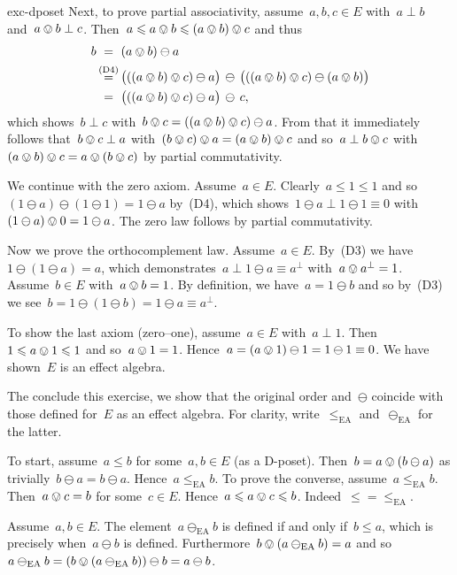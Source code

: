 \begin{solution}{exc-dposet}
Next, to prove partial associativity, assume~$a,b,c\in E$
    with~$a \perp b$ and~$a \ovee b \perp c$.
Then~$a \leq a \ovee b \leq (a \ovee b) \ovee c$ and thus
\begin{align*}
    b & \ =\ (a \ovee b) \ominus a \\
    & \ \overset{\mathclap{\mathrm{(D4)}}}{=} \ 
    \bigl( ((a \ovee b) \ovee c) \ominus a \bigr) \,
    \ominus \, \bigl( ((a\ovee b) \ovee c) \ominus (a \ovee b) \bigr) \\
    & \ = \ 
    \bigl( ((a \ovee b) \ovee c) \ominus a \bigr) \,
    \ominus \, c,
\end{align*}
which shows~$b \perp c$
    with~$b \ovee c=  ((a \ovee b) \ovee c) \ominus a$.
From that it immediately follows
    that~$b \ovee c \perp a$ with~$(b\ovee c)\ovee a = (a\ovee b) \ovee c$
        and so~$a \perp b \ovee c$
            with~$(a \ovee b) \ovee c = a \ovee (b \ovee c)$
                by partial commutativity.

We continue with the zero axiom.
Assume~$a \in E$.
Clearly~$a \leq 1 \leq 1$ and
    so~$(1 \ominus a) \ominus (1 \ominus 1) = 1 \ominus a$ by~(D4),
    which shows~$1 \ominus a \perp  1\ominus 1 \equiv 0$
    with~$(1 \ominus a) \ovee 0 = 1\ominus a$.
    The zero law follows by partial commutativity.

Now we prove the orthocomplement law.
Assume~$a \in E$.
By~(D3) we have~$1 \ominus( 1\ominus a) = a$,
    which demonstrates~$a \perp 1\ominus a \equiv a^\perp$
    with~$a \ovee a^\perp = 1$.
Assume~$b \in E$ with~$a \ovee b = 1$.
By definition, we have~$a = 1 \ominus b$ and so by~(D3)
    we see~$b = 1 \ominus (1 \ominus b) = 1 \ominus a \equiv a^\perp$.

To show the last axiom (zero--one), assume~$a \in E$ with~$a\perp 1$.
Then~$1 \leq a\ovee 1 \leq 1$ and so~$a \ovee 1 = 1$.
Hence~$a = (a\ovee 1) \ominus 1 = 1\ominus 1 \equiv 0$.
We have shown~$E$ is an effect algebra.

The conclude this exercise, we show that the original
    order and~$\ominus$ coincide with
    those defined for~$E$ as an effect algebra.
For clarity, write~$\leq_{\mathrm{EA}}$ and~$\ominus_{\mathrm{EA}}$
    for the latter.

To start, assume~$a \leq b$ for some~$a,b \in E$ (as a D-poset).
Then~$b = a \ovee (b \ominus a)$
    as trivially~$b \ominus a = b \ominus a$.
Hence~$a \leq_{\mathrm{EA}} b$.
To prove the converse, assume~$a \leq_{\mathrm{EA}} b$.
Then~$a \ovee c = b$ for some~$c \in E$.
Hence~$a \leq a \ovee c \leq b$.  Indeed~$\leq = \leq_{\mathrm{EA}}$.

Assume~$a,b\in E$.
The element~$a \ominus_{\textrm{EA}} b$ is defined
    if and only if~$b \leq a$,
    which is precisely when~$ a \ominus b$ is defined.
        Furthermore~$b \ovee (a \ominus_{\textrm{EA}} b) = a$
        and so~$
        a \ominus_{\textrm{EA}} b =
        (b \ovee (a \ominus_{\textrm{EA}} b)) \ominus b =
        a \ominus b $.
\end{solution}
